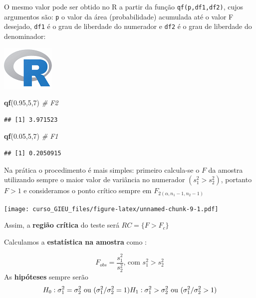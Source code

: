 \documentclass[
]{book}
\newenvironment{Shaded}{\begin{snugshade}}{\end{snugshade}}
\newcommand{\CommentTok}[1]{\textcolor[rgb]{0.56,0.35,0.01}{\textit{#1}}}
\newcommand{\DecValTok}[1]{\textcolor[rgb]{0.00,0.00,0.81}{#1}}
\newcommand{\FloatTok}[1]{\textcolor[rgb]{0.00,0.00,0.81}{#1}}
\newcommand{\KeywordTok}[1]{\textcolor[rgb]{0.13,0.29,0.53}{\textbf{#1}}}
\newcommand{\NormalTok}[1]{#1}
\begin{document}
O mesmo valor pode ser obtido no R a partir da função \texttt{qf(p,df1,df2)}, cujos argumentos são: \texttt{p} o valor da área (probabilidade) acumulada até o valor F desejado, \texttt{df1} é o grau de liberdade do numerador e \texttt{df2} é o grau de liberdade do denominador:

\includegraphics{R.png}

\begin{Shaded}
\begin{Highlighting}[]
\KeywordTok{qf}\NormalTok{(}\FloatTok{0.95}\NormalTok{,}\DecValTok{5}\NormalTok{,}\DecValTok{7}\NormalTok{) }\CommentTok{# F2}
\end{Highlighting}
\end{Shaded}

\begin{verbatim}
## [1] 3.971523
\end{verbatim}

\begin{Shaded}
\begin{Highlighting}[]
\KeywordTok{qf}\NormalTok{(}\FloatTok{0.05}\NormalTok{,}\DecValTok{5}\NormalTok{,}\DecValTok{7}\NormalTok{) }\CommentTok{# F1}
\end{Highlighting}
\end{Shaded}

\begin{verbatim}
## [1] 0.2050915
\end{verbatim}

Na prática o procedimento é mais simples: primeiro calcula-se o \(F\) da amostra utilizando sempre o maior valor de variância no numerador \((s^2_1 > s_2^2)\), portanto \(F > 1\) e consideramos o ponto crítico sempre em \(F_{2(\alpha, n_1-1, n_2-1)}\)

\texttt{[image: curso\_GIEU\_files/figure-latex/unnamed-chunk-9-1.pdf]}

Assim, a \textbf{região crítica} do teste será \(RC = \{F > F_c\}\)

Calculamos a \textbf{estatística na amostra} como :

\[
F_{obs} = \frac{s^2_1}{s^2_2} \text{, com }  s_1^2 > s^2_2
\]
As \textbf{hipóteses} sempre serão
\[
H_0: \sigma_1^2 = \sigma_2^2 \text{   ou   } (\sigma_1^2 /\sigma_2^2 =1) \\
H_1: \sigma_1^2 > \sigma_2^2 \text{   ou   } (\sigma_1^2 /\sigma_2^2 > 1)
\]
\end{document}
